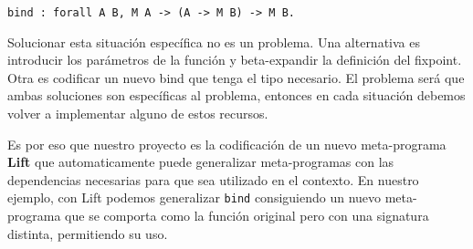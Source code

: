 \begin{lstlisting}
bind : forall A B, M A -> (A -> M B) -> M B.
\end{lstlisting}

Solucionar esta situación específica no es un problema.
Una alternativa es introducir los parámetros de la función y beta-expandir la definición del fixpoint.
Otra es codificar un nuevo bind que tenga el tipo necesario.
El problema será que ambas soluciones son específicas al problema, entonces en cada situación debemos volver a implementar alguno de estos recursos.

Es por eso que nuestro proyecto es la codificación de un nuevo meta-programa \textbf{Lift} que automaticamente puede generalizar meta-programas con las dependencias necesarias para que sea utilizado en el contexto.
En nuestro ejemplo, con Lift podemos generalizar \lstinline{bind} consiguiendo un nuevo meta-programa que se comporta como la función original pero con una signatura distinta, permitiendo su uso.

